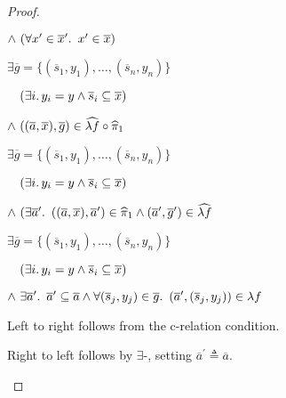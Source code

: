 \begin{prop}
\begin{proof}
\begin{itemize}
      \step
        \quad$\land~(\forall x^\prime\in\overline{x}^\prime\ldotp~x^\prime\in\overline{x})$
      \addtolength{\itemsep}{.2\baselineskip}

      \step[\iffs]
        $\exists\overline{g} = \{(\overline{s}_1,y_1),\ldots,(\overline{s}_n,y_n)\}$

      \addtolength{\itemsep}{-.2\baselineskip}
      \step
        \quad$\phantom{\land}~(\exists i\ldotp y_i=y\land\overline{s}_i\subseteq\overline{x})$

      \step
        \quad$\land~((\overline{a},\overline{x}), \overline{g})\in\widehat{\lambda f}\circ\widehat{\pi}_1$
        \marginnote{\Thm-\ref{prop:rel-hat-comp}}

      \addtolength{\itemsep}{.2\baselineskip}

      \step[\iffs]
        $\exists\overline{g} = \{(\overline{s}_1,y_1),\ldots,(\overline{s}_n,y_n)\}$

      \addtolength{\itemsep}{-.2\baselineskip}
      \step
        \quad$\phantom{\land}~(\exists i\ldotp y_i=y\land\overline{s}_i\subseteq\overline{x})$

      \step
        \quad$\land~(\exists\overline{a}^\prime\ldotp~((\overline{a},\overline{x}),\overline{a}^\prime)\in\widehat{\pi}_1\land(\overline{a}^\prime,\overline{g}^\prime)\in\widehat{\lambda f}$

      \addtolength{\itemsep}{.2\baselineskip}

      \step[\iffs]
        $\exists\overline{g} = \{(\overline{s}_1,y_1),\ldots,(\overline{s}_n,y_n)\}$

      \addtolength{\itemsep}{-.2\baselineskip}
      \step
        \quad$\phantom{\land}~(\exists i\ldotp y_i=y\land\overline{s}_i\subseteq\overline{x})$

      \step
        \quad$\land~\exists\overline{a}^\prime\ldotp~\overline{a}^\prime\subseteq\overline{a}\land\forall(\overline{s}_j,y_j)\in\overline{g}\ldotp~(\overline{a}^\prime,(\overline{s}_j, y_j))\in\lambda f$

      \addtolength{\itemsep}{.2\baselineskip}

      \step
        Left to right follows from the c-relation condition.

      \step
        Right to left follows by $\exists$-\Intro, setting $\overline{a}^\prime\triangleq\overline{a}$.


\end{itemize}
\end{proof}
\end{prop}
